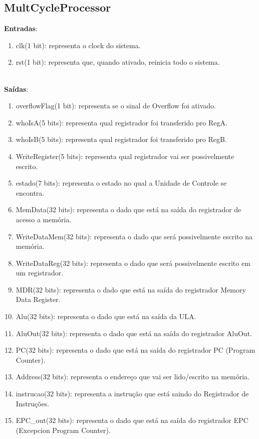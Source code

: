 \documentclass{article}
\begin{document}
    \subsection{MultCycleProcessor}
    \textbf{Entradas}:
    \begin{enumerate}
        \item clk(1 bit): representa o clock do sistema.
        \item rst(1 bit): representa que, quando ativado, reinicia todo o sistema.\\
    \end{enumerate}
\\
    \textbf{Saídas}:
    \begin{enumerate}
        \item overflowFlag(1 bit): representa se o sinal de Overflow foi ativado.
        \item whoIsA(5 bits): representa qual registrador foi transferido pro RegA.
        \item whoIsB(5 bits): representa qual registrador foi transferido pro RegB.
        \item WriteRegister(5 bits): representa qual registrador vai ser possivelmente escrito.
        \item estado(7 bits): representa o estado no qual a Unidade de Controle se encontra.
        \item MemData(32 bits): representa o dado que está na saída do registrador de acesso a memória.
        \item WriteDataMem(32 bits): representa o dado que será possivelmente escrito na memória.
        \item WriteDataReg(32 bits): representa o dado que será possivelmente escrito em um registrador.
        \item MDR(32 bits): representa o dado que está na saída do registrador Memory Data Register.
        \item Alu(32 bits): representa o dado que está na saída da ULA.
        \item AluOut(32 bits): representa o dado que está na saída do registrador AluOut.
        \item PC(32 bits): representa o dado que está na saída do registrador PC (Program Counter).
        \item Address(32 bits): representa o endereço que vai ser lido/escrito na memória.
        \item instrucao(32 bits): representa a instrução que está saindo do Registrador de Instruções.
        \item EPC\_out(32 bits): representa o dado que está na saída do registrador EPC (Excepcion Program Counter).\\
    \end{enumerate}
\end{document}
